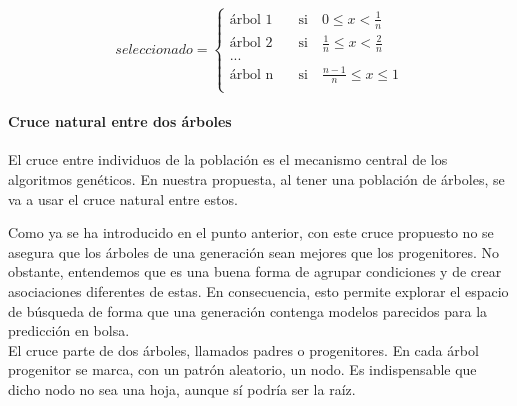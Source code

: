 \[   
seleccionado = 
\begin{cases}
\text{\'arbol 1} &\quad\text{si}\quad 0 \leq x < \frac{1}{n}\\
\text{\'arbol 2} &\quad\text{si}\quad \frac{1}{n} \leq x < \frac{2}{n}\\
\text{...} \\
\text{\'arbol n} &\quad\text{si}\quad \frac{n-1}{n} \leq x \leq 1\\ 
\end{cases}
\]



\paragraph{Cruce natural entre dos \'arboles}\label{sec:cruce}
El cruce entre individuos de la poblaci\'on es el mecanismo central de los algoritmos gen\'eticos. En nuestra propuesta, al tener una poblaci\'on de \'arboles, se va a usar el cruce natural entre estos. 

Como ya se ha introducido en el punto anterior, con este cruce propuesto no se asegura que los \'arboles de una generaci\'on sean mejores que los progenitores. No obstante, entendemos que es una buena forma de agrupar condiciones y de crear asociaciones diferentes de estas. En consecuencia, esto permite explorar el espacio de b\'usqueda de forma que una generaci\'on contenga modelos parecidos para la predicci\'on en bolsa.\\


El cruce parte de dos \'arboles, llamados padres o progenitores. En cada \'arbol progenitor se marca, con un patr\'on aleatorio, un nodo. Es indispensable que dicho nodo no sea una hoja, aunque s\'i podr\'ia ser la ra\'iz. 


